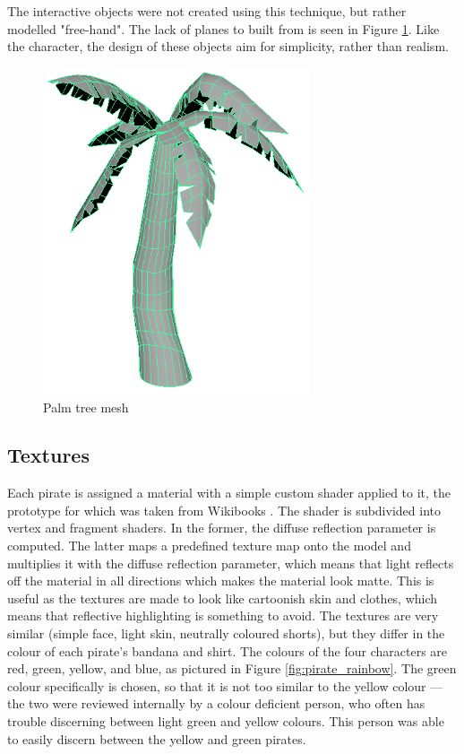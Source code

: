 The interactive objects were not created using this technique, but rather modelled "free-hand". The lack of planes to built from is seen in Figure \ref{fig:palmtree_mesh}. Like the character, the design of these objects aim for simplicity, rather than realism.

\begin{figure}[h!]
	\centering
	\includegraphics[width=0.7\textwidth]{figures/palmtree_mesh.png}
	\caption{Palm tree mesh \label{fig:palmtree_mesh}}
\end{figure}

\subsection{Textures}
Each pirate is assigned a material with a simple custom shader applied to it, the prototype for which was taken from Wikibooks \cite{LightingTexturedSurfaces}. The shader is subdivided into vertex and fragment shaders. In the former, the diffuse reflection parameter is computed. The latter maps a predefined texture map onto the model and multiplies it with the diffuse reflection parameter, which means that light reflects off the material in all directions which makes the material look matte. This is useful as the textures are made to look like cartoonish skin and clothes, which means that reflective highlighting is something to avoid. The textures are very similar (simple face, light skin, neutrally coloured shorts), but they differ in the colour of each pirate's bandana and shirt. The colours of the four characters are red, green, yellow, and blue, as pictured in Figure \ref{fig:pirate_rainbow}. The green colour specifically is chosen, so that it is not too similar to the yellow colour --- the two were reviewed internally by a colour deficient person, who often has trouble discerning between light green and yellow colours. This person was able to easily discern between the yellow and green pirates.

